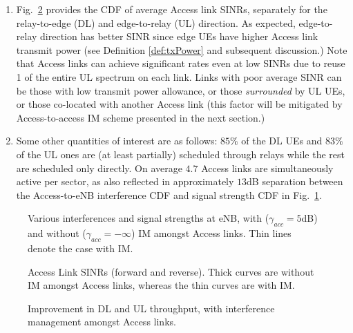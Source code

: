 \documentclass[journal]{IEEEtran}
\begin{document}
\begin{enumerate}
  \item Fig.~\ref{fig:acc} provides the CDF of average Access link SINRs, separately for the relay-to-edge (DL) and edge-to-relay (UL) direction.  As expected, edge-to-relay direction has better SINR since edge UEs have higher Access link transmit power (see Definition \ref{def:txPower} and subsequent discussion.) Note that Access links can achieve significant rates even at low SINRs due to reuse 1 of the entire UL spectrum on each link.  Links with poor average SINR can be those with low transmit power allowance, or those {\em surrounded} by UL UEs, or those co-located with another Access link (this factor will be mitigated by Access-to-access IM scheme presented in the next section.)
  \item Some other quantities of interest are as follows: $85\%$ of the DL UEs and $83\%$ of the UL ones are (at least partially) scheduled through relays while the rest are scheduled only directly.  On average $4.7$ Access links are simultaneously active per sector, as also reflected in approximately $13$dB separation between the Access-to-eNB interference CDF and signal strength CDF in Fig.~\ref{fig:intf}.
\end{enumerate}

\begin{figure}
\centering
{}
\caption{Various interferences and signal strengths at eNB, with ($\gamma_{acc}=5$dB) and without ($\gamma_{acc}=-\infty$) IM amongst Access links. Thin lines denote the case with IM.}
\label{fig:intf}
\end{figure}
\begin{figure}
\centering
{}
\caption{Access Link SINRs (forward and reverse). Thick curves are without IM amongst Access links, whereas the thin curves are with IM.}
\label{fig:acc}
\vspace{-0.2in}
\end{figure}
\begin{figure}
\centering
{}
\caption{Improvement in DL and UL throughput, with interference management amongst Access links.}
\vspace{-0.2in}
\label{fig:gainIM}
\end{figure}
\end{document}
